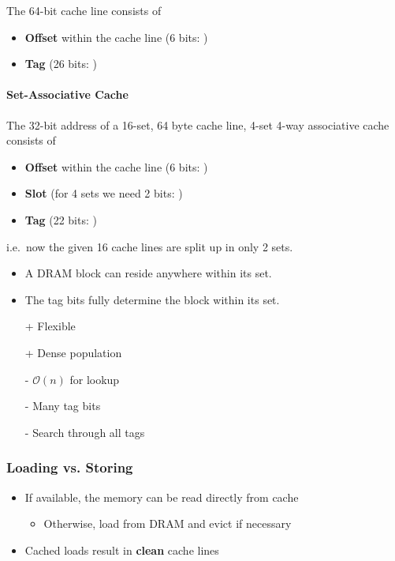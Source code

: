 \newpar{}
The 64-bit cache line consists of
\begin{itemize}
    \item \textbf{Offset} within the cache line (6 bits: )
    \item \textbf{Tag} (26 bits: )
\end{itemize}

\paragraph{Set-Associative Cache}

\newpar{}

The 32-bit address of a 16-set, 64 byte cache line, 4-set 4-way associative cache consists of
\begin{itemize}
    \item \textbf{Offset} within the cache line (6 bits: )
    \item \textbf{Slot} (for 4 sets we need 2 bits: )
    \item \textbf{Tag} (22 bits: )
\end{itemize}
i.e.\ now the given 16 cache lines are split up in only 2 sets. 
\begin{itemize}
    \item A DRAM block can reside anywhere within its set.
    \item The tag bits fully determine the block within its set.
\end{itemize}

\newpar{}
\begin{itemize}
    \item[+] Flexible
    \item[+] Dense population
    \item[-] $\mathcal{O}(n)$ for lookup
    \item[-] Many tag bits
    \item[-] Search through all tags
\end{itemize}

\subsubsection{Loading vs. Storing}
\begin{itemize}
    \item If available, the memory can be read directly from cache
    \begin{itemize}
        \item Otherwise, load from DRAM and evict if necessary
    \end{itemize}
    \item Cached loads result in \textbf{clean} cache lines
\end{itemize}

